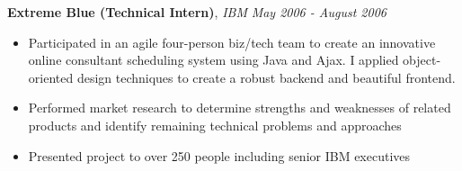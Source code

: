 \documentclass[9pt]{article}
\newenvironment{changemargin}[2]{%
  \begin{list}{}{%
    \setlength{\topsep}{0pt}%
    \setlength{\leftmargin}{#1}%
    \setlength{\rightmargin}{#2}%
    \setlength{\listparindent}{\parindent}%
    \setlength{\itemindent}{\parindent}%
    \setlength{\parsep}{\parskip}%
  }%
  \item[]}{\end{list}
}
\newcommand{\jobdescription}[1]{
	\begin{changemargin}{0.15in}{0.15in}
    \smallskip
		{#1}
    \medskip
	\end{changemargin}
}
\newcommand{\jobtitle}[3]{
	\textbf{#1}, \emph{#2} \hfill \emph{#3}\\
}
\newenvironment{body} {
	\vspace*{-16pt}
	\begin{changemargin}{-0.25in}{-0.5in}
  }	
	{\end{changemargin}
}
\begin{document}
\begin{body}
	\jobtitle{Extreme Blue (Technical Intern)}{IBM}{May 2006 - August 2006}
  \jobdescription {
  	\begin{itemize} \itemsep -0pt  %
      \item Participated in an agile four-person biz/tech team to create an innovative online consultant scheduling system using Java and Ajax. I applied object-oriented design techniques to create a robust backend and beautiful frontend. 
      \item Performed market research to determine strengths and weaknesses of related products and identify remaining technical problems and approaches\\
      \item Presented project to over 250 people including senior IBM executives\\
    \end{itemize}
  }



\end{body}
\end{document}
